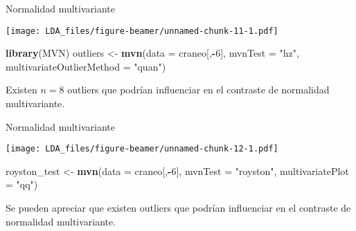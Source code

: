 \documentclass[ignorenonframetext,]{beamer}
\newenvironment{Shaded}{\begin{snugshade}}{\end{snugshade}}
\newcommand{\KeywordTok}[1]{\textcolor[rgb]{0.13,0.29,0.53}{\textbf{#1}}}
\newcommand{\DataTypeTok}[1]{\textcolor[rgb]{0.13,0.29,0.53}{#1}}
\newcommand{\DecValTok}[1]{\textcolor[rgb]{0.00,0.00,0.81}{#1}}
\newcommand{\StringTok}[1]{\textcolor[rgb]{0.31,0.60,0.02}{#1}}
\newcommand{\OperatorTok}[1]{\textcolor[rgb]{0.81,0.36,0.00}{\textbf{#1}}}
\newcommand{\NormalTok}[1]{#1}
\begin{document}
\begin{frame}[fragile]{Normalidad multivariante}

\hypertarget{left}{}
\texttt{[image: LDA\_files/figure-beamer/unnamed-chunk-11-1.pdf]}

\hypertarget{right}{}
\begin{Shaded}
\begin{Highlighting}[]
\KeywordTok{library}\NormalTok{(MVN)}
\NormalTok{outliers <-}\StringTok{ }\KeywordTok{mvn}\NormalTok{(}\DataTypeTok{data =}\NormalTok{ craneo[,}\OperatorTok{-}\DecValTok{6}\NormalTok{], }\DataTypeTok{mvnTest =} \StringTok{"hz"}\NormalTok{, }\DataTypeTok{multivariateOutlierMethod =} \StringTok{"quan"}\NormalTok{)}
\end{Highlighting}
\end{Shaded}

Existen \(n=8\) outliers que podrían influenciar en el contraste de
normalidad multivariante.

\end{frame}

\begin{frame}[fragile]{Normalidad multivariante}

\hypertarget{left}{}
\texttt{[image: LDA\_files/figure-beamer/unnamed-chunk-12-1.pdf]}

\hypertarget{right}{}
\begin{Shaded}
\begin{Highlighting}[]
\NormalTok{royston_test <-}\StringTok{ }\KeywordTok{mvn}\NormalTok{(}\DataTypeTok{data =}\NormalTok{ craneo[,}\OperatorTok{-}\DecValTok{6}\NormalTok{], }\DataTypeTok{mvnTest =} \StringTok{"royston"}\NormalTok{, }\DataTypeTok{multivariatePlot =} \StringTok{"qq"}\NormalTok{)}
\end{Highlighting}
\end{Shaded}

Se pueden apreciar que existen outliers que podrían influenciar en el
contraste de normalidad multivariante.

\end{frame}
\end{document}
